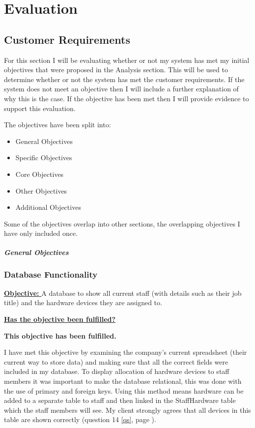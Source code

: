 \chapter{Evaluation}

\section{Customer Requirements}

For this section I will be evaluating whether or not my system has met my initial objectives that were proposed in the Analysis section. This will be used to determine whether or not the system has met the customer requirements. If the system does not meet an objective then I will include a further explanation of why this is the case. If the objective has been met then I will provide evidence to support this evaluation.

The objectives have been split into:
\begin{itemize}
\item{General Objectives}
\item{Specific Objectives}
\item{Core Objectives}
\item{Other Objectives}
\item{Additional Objectives}
\end{itemize}

Some of the objectives overlap into other sections, the overlapping objectives I have only included once.

\paragraph{General Objectives}

\subsection{Database Functionality}\label{staffhardware}

\underline{\textbf{Objective:} } A database to show all current staff (with details such as their job title) and the hardware devices they are assigned to.

\underline{\textbf{Has the objective been fulfilled?}}

\textbf{This objective has been fulfilled.}

I have met this objective by examining the company's current spreadsheet (their current way to store data) and making sure that all the correct fields were included in my database. To display allocation of hardware devices to staff members it was important to make the database relational, this was done with the use of primary and foreign keys. Using this method means hardware can be added to a separate table to staff and then linked in the StaffHardware table which the staff members will see. My client strongly agrees that all devices in this table are shown correctly (question 14 \ref{qs}, page \pageref{qs}).

